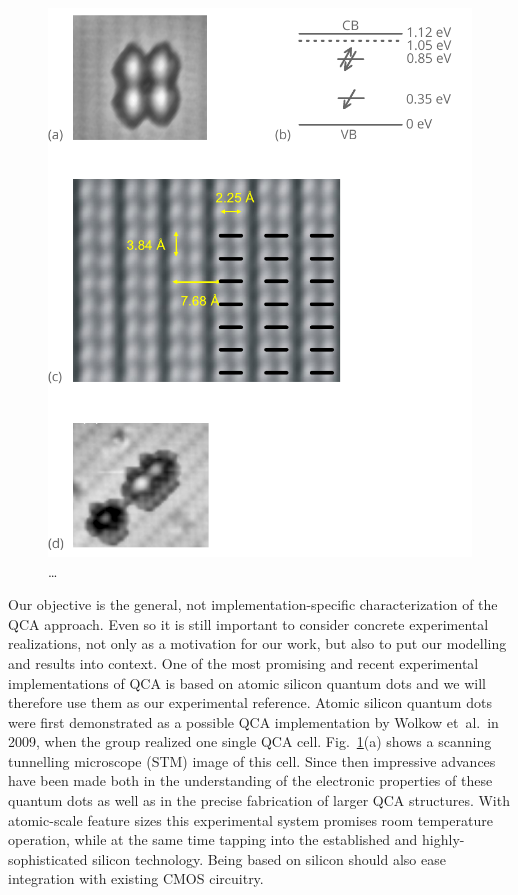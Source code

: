 \begin{figure}
  \center
  \includegraphics{silicon}
  \caption{\ldots}
  \label{fig:silicon}
\end{figure}

Our objective is the general, not implementation-specific characterization of
the QCA approach. Even so it is still important to consider concrete
experimental realizations, not only as a motivation for our work, but also to
put our modelling and results into context. One of the most promising and recent
experimental implementations of QCA is based on atomic silicon quantum dots and
we will therefore use them as our experimental reference. Atomic silicon quantum
dots were first demonstrated as a possible QCA implementation by Wolkow et~al.\
in 2009, when the group realized one single QCA cell. Fig.~\ref{fig:silicon}(a)
shows a scanning tunnelling microscope (STM) image of this cell. Since then
impressive advances have been made both in the understanding of the electronic
properties of these quantum dots as well as in the precise fabrication of larger
QCA structures. With atomic-scale feature sizes this experimental system
promises room temperature operation, while at the same time tapping into the
established and highly-sophisticated silicon technology. Being based on silicon
should also ease integration with existing CMOS circuitry.

